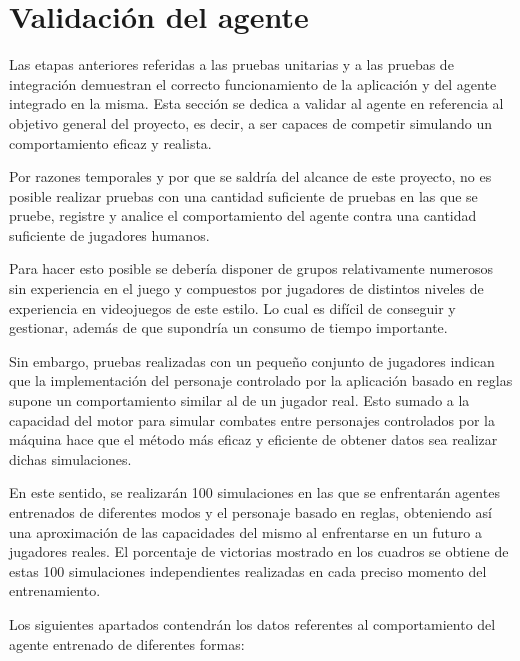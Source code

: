 \section{Validación del agente}

Las etapas anteriores referidas a las pruebas unitarias y a las pruebas de integración demuestran el correcto funcionamiento de la aplicación y del agente integrado en la misma. Esta sección se dedica a validar al agente en referencia al objetivo general del proyecto, es decir, a ser capaces de competir simulando un comportamiento eficaz y realista.

\bigskip

Por razones temporales y por que se saldría del alcance de este proyecto, no es posible realizar pruebas con una cantidad suficiente de pruebas en las que se pruebe, registre y analice el comportamiento del agente contra una cantidad suficiente de jugadores humanos.

\bigskip

Para hacer esto posible se debería disponer de grupos relativamente numerosos sin experiencia en el juego y compuestos por jugadores de distintos niveles de experiencia en videojuegos de este estilo. Lo cual es difícil de conseguir y gestionar, además de que supondría un consumo de tiempo importante.

\bigskip

Sin embargo, pruebas realizadas con un pequeño conjunto de jugadores indican que la implementación del personaje controlado por la aplicación basado en reglas supone un comportamiento similar al de un jugador real. Esto sumado a la capacidad del motor para simular combates entre personajes controlados por la máquina hace que el método más eficaz y eficiente de obtener datos sea realizar dichas simulaciones.

\bigskip

En este sentido, se realizarán 100 simulaciones en las que se enfrentarán agentes entrenados de diferentes modos y el personaje basado en reglas, obteniendo así una aproximación de las capacidades del mismo al enfrentarse en un futuro a jugadores reales. El porcentaje de victorias mostrado en los cuadros se obtiene de estas 100 simulaciones independientes realizadas en cada preciso momento del entrenamiento.

\bigskip

Los siguientes apartados contendrán los datos referentes al comportamiento del agente entrenado de diferentes formas:

